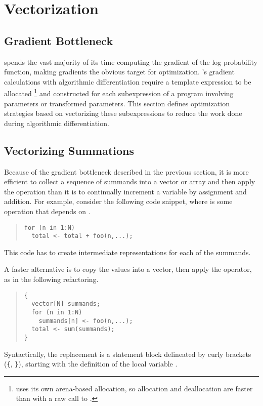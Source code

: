 \section{Vectorization}

\subsection{Gradient Bottleneck}

\Stan spends the vast majority of its time computing the gradient of
the log probability function, making gradients the obvious target for
optimization.  \Stan's gradient calculations with algorithmic
differentiation require a template expression to be allocated%
%
\footnote{\Stan uses its own arena-based allocation, so allocation and
  deallocation are faster than with a raw call to .}
%
and constructed for each subexpression of a \Stan program involving
parameters or transformed parameters.  This section defines
optimization strategies based on vectorizing these subexpressions to
reduce the work done during algorithmic differentiation.

\subsection{Vectorizing Summations}

Because of the gradient bottleneck described in the previous section,
it is more efficient to collect a sequence of summands into a vector
or array and then apply the  operation than it is to
continually increment a variable by assignment and addition.  For
example, consider the following code snippet, where  is
some operation that depends on .
%
\begin{quote}
\begin{Verbatim}[fontsize=\small]
for (n in 1:N) 
  total <- total + foo(n,...);
\end{Verbatim}
\end{quote}
%
This code has to create intermediate representations for each
of the  summands.  

A faster alternative is to copy the values into a vector, then
apply the  operator, as in the following refactoring.
%
\begin{quote}
\begin{Verbatim}[fontsize=\small]
{  
  vector[N] summands;
  for (n in 1:N) 
    summands[n] <- foo(n,...);
  total <- sum(summands);
}
\end{Verbatim}
\end{quote}
%
Syntactically, the replacement is a statement block delineated
by curly brackets (\Verb|{|, \Verb|}|), starting with the definition
of the local variable .

